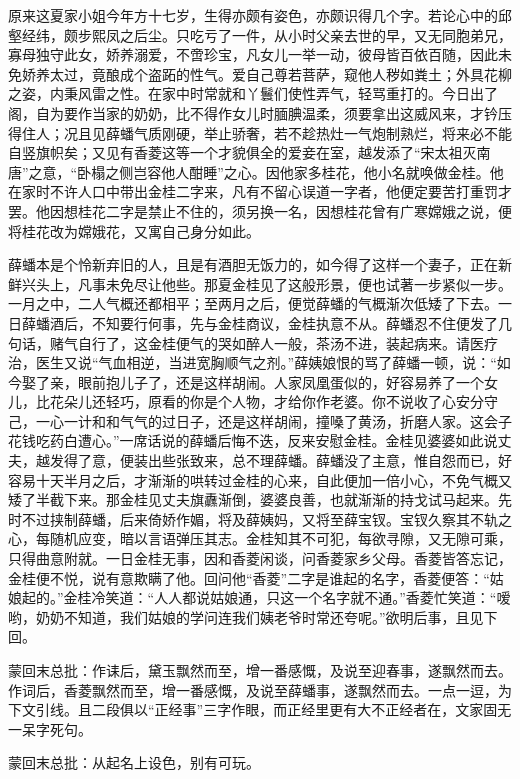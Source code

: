 \begin{parag}
    原来这夏家小姐今年方十七岁，生得亦颇有姿色，亦颇识得几个字。若论心中的邱壑经纬，颇步熙凤之后尘。只吃亏了一件，从小时父亲去世的早，又无同胞弟兄，寡母独守此女，娇养溺爱，不啻珍宝，凡女儿一举一动，彼母皆百依百随，因此未免娇养太过，竟酿成个盗跖的性气。爱自己尊若菩萨，窥他人秽如粪土；外具花柳之姿，内秉风雷之性。在家中时常就和丫鬟们使性弄气，轻骂重打的。今日出了阁，自为要作当家的奶奶，比不得作女儿时腼腆温柔，须要拿出这威风来，才钤压得住人；况且见薛蟠气质刚硬，举止骄奢，若不趁热灶一气炮制熟烂，将来必不能自竖旗帜矣；又见有香菱这等一个才貌俱全的爱妾在室，越发添了“宋太祖灭南唐”之意，“卧榻之侧岂容他人酣睡”之心。因他家多桂花，他小名就唤做金桂。他在家时不许人口中带出金桂二字来，凡有不留心误道一字者，他便定要苦打重罚才罢。他因想桂花二字是禁止不住的，须另换一名，因想桂花曾有广寒嫦娥之说，便将桂花改为嫦娥花，又寓自己身分如此。
\end{parag}


\begin{parag}
    薛蟠本是个怜新弃旧的人，且是有酒胆无饭力的，如今得了这样一个妻子，正在新鲜兴头上，凡事未免尽让他些。那夏金桂见了这般形景，便也试著一步紧似一步。一月之中，二人气概还都相平；至两月之后，便觉薛蟠的气概渐次低矮了下去。一日薛蟠酒后，不知要行何事，先与金桂商议，金桂执意不从。薛蟠忍不住便发了几句话，赌气自行了，这金桂便气的哭如醉人一般，茶汤不进，装起病来。请医疗治，医生又说“气血相逆，当进宽胸顺气之剂。”薛姨娘恨的骂了薛蟠一顿，说：“如今娶了亲，眼前抱儿子了，还是这样胡闹。人家凤凰蛋似的，好容易养了一个女儿，比花朵儿还轻巧，原看的你是个人物，才给你作老婆。你不说收了心安分守己，一心一计和和气气的过日子，还是这样胡闹，撞嗓了黄汤，折磨人家。这会子花钱吃药白遭心。”一席话说的薛蟠后悔不迭，反来安慰金桂。金桂见婆婆如此说丈夫，越发得了意，便装出些张致来，总不理薛蟠。薛蟠没了主意，惟自怨而已，好容易十天半月之后，才渐渐的哄转过金桂的心来，自此便加一倍小心，不免气概又矮了半截下来。那金桂见丈夫旗纛渐倒，婆婆良善，也就渐渐的持戈试马起来。先时不过挟制薛蟠，后来倚娇作媚，将及薛姨妈，又将至薛宝钗。宝钗久察其不轨之心，每随机应变，暗以言语弹压其志。金桂知其不可犯，每欲寻隙，又无隙可乘，只得曲意附就。一日金桂无事，因和香菱闲谈，问香菱家乡父母。香菱皆答忘记，金桂便不悦，说有意欺瞒了他。回问他“香菱”二字是谁起的名字，香菱便答：“姑娘起的。”金桂冷笑道：“人人都说姑娘通，只这一个名字就不通。”香菱忙笑道：“嗳哟，奶奶不知道，我们姑娘的学问连我们姨老爷时常还夸呢。”欲明后事，且见下回。
\end{parag}


\begin{parag}
    \begin{note}蒙回末总批：作诔后，黛玉飘然而至，增一番感慨，及说至迎春事，遂飘然而去。作词后，香菱飘然而至，增一番感慨，及说至薛蟠事，遂飘然而去。一点一逗，为下文引线。且二段俱以“正经事”三字作眼，而正经里更有大不正经者在，文家固无一呆字死句。\end{note}
\end{parag}


\begin{parag}
    \begin{note}蒙回末总批：从起名上设色，别有可玩。\end{note}
\end{parag}

